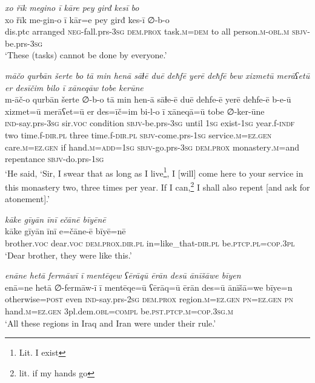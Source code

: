 \ea \label{ŠJ.90}
\textit{xo řīk megino ī kāre pey girđ kesī bo} \\ 
\gll xo řīk me-gin-o ī kār=e pey girđ kes-ī ∅-b-o \\ 
 dis.ptc arranged \textsc{neg-}fall.prs\textsc{-3sg} \textsc{dem.prox} task\textsc{.m}\textsc{=dem} to all person\textsc{.m}\textsc{-obl}\textsc{.m} \textsc{sbjv-}be.prs\textsc{-3sg} \\ 
\glt `These (tasks) cannot be done by everyone.'
\z 
 
\ea \label{ŠJ.98}
\textit{māčo qurbān šerte bo tā min henā sāɫē duē deħfē yerē deħfē bew xizmetū merāʕetū er desīčim bilo ī xāneqāw tobe kerūne} \\ 
\gll m-āč-o qurbān šerte ∅-b-o tā min hen-ā sāɫe-ē duē deħfe-ē yerē deħfe-ē b-e-ū xizmet=ū merāʕet=ū er des=īč=im bi-l-o ī xāneqā=ū tobe ∅-ker-ūne \\ 
 \textsc{ind-}say.prs\textsc{-3sg} sir.\textsc{voc} condition \textsc{sbjv-}be.prs\textsc{-3sg} until \textsc{1sg} exist\textsc{-\textsc{1sg}} year.f\textsc{-indf} two time.f\textsc{-dir}\textsc{.pl} three time.f\textsc{-dir}\textsc{.pl} \textsc{sbjv-}come.prs\textsc{-\textsc{1sg}} service\textsc{.m}\textsc{=ez.gen} care\textsc{.m}\textsc{=ez.gen} if hand\textsc{.m}\textsc{=add}\textsc{=\textsc{1sg}} \textsc{sbjv-}go.prs\textsc{-3sg} \textsc{dem.prox} monastery\textsc{.m}=and repentance \textsc{sbjv-}do.prs\textsc{-\textsc{1sg}} \\ 
\glt `He said, ‘Sir, I swear that as long as I live\footnote{Lit. I exist}, I [will] come here to your service in this monastery two, three times per year. If I can,\footnote{lit. if my hands go} I shall also repent [and ask for atonement].'
\z 
 
\ea \label{ŠJ.99}
\textit{kāke gīyān īnī ečānē bīyēnē} \\ 
\gll kāke gīyān īnī e=čāne-ē bīyē=nē \\ 
 brother.\textsc{voc} dear.\textsc{voc} \textsc{dem.prox}\textsc{.dir}\textsc{.pl} in=like\_that\textsc{-dir}\textsc{.pl} be\textsc{.ptcp}\textsc{.pl}\textsc{=cop}\textsc{.3pl} \\ 
\glt `Dear brother, they were like this.'
\z 
 
\ea \label{ŠJ.102}
\textit{enāne hetā fermāwī ī mentēqew ʕērāqū ērān desū ānīšāwe bīyen} \\ 
\gll enā=ne hetā ∅-fermāw-ī ī mentēqe=ū ʕērāq=ū ērān des=ū ānīšā=we bīye=n \\ 
 otherwise\textsc{=\textsc{post}} even \textsc{ind-}say.prs-\textsc{2sg} \textsc{dem.prox} region\textsc{.m}\textsc{=ez.gen} \textsc{pn}\textsc{=ez.gen} \textsc{pn} hand\textsc{.m}\textsc{=ez.gen} 3pl.dem\textsc{.obl}\textsc{=compl} be\textsc{.pst}\textsc{.ptcp}\textsc{.m}\textsc{=cop}\textsc{.3sg}\textsc{.m} \\ 
\glt `All these regions in Iraq and Iran were under their rule.'
\z 
 
